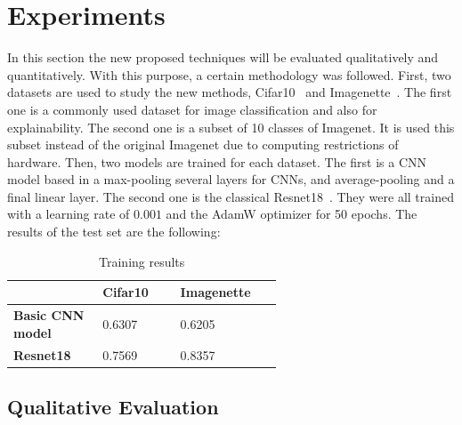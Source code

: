 \documentclass[preprint,12pt]{elsarticle}
\begin{document}
\section{Experiments}
\label{sec:experiments}
In this section the new proposed techniques will be evaluated qualitatively and quantitatively. With this purpose, a certain methodology was followed. First, two datasets are used to study the new methods, Cifar10~\cite{CIFAR10CIFAR100Datasets} and Imagenette~\cite{Imagenette2022}. The first one is a commonly used dataset for image classification and also for explainability. The second one is a subset of 10 classes of Imagenet. It is used this subset instead of the original Imagenet due to computing restrictions of hardware. Then, two models are trained for each dataset. The first is a CNN model based in a max-pooling several layers for CNNs, and average-pooling and a final linear layer. The second one is the classical Resnet18~\cite{heDeepResidualLearning2016}. They were all trained with a learning rate of $0.001$ and the AdamW optimizer for 50 epochs. The results of the test set are the following:

\begin{table}[h!]
    \begin{center}
        \begin{tabular}{|L{0.2\linewidth}|C{0.2\linewidth}|C{0.2\linewidth}|}
            \hline
            \textbf{} & \textbf{Cifar10} & \textbf{Imagenette}\\ \hline
            \textbf{Basic CNN model} & 0.6307 & 0.6205 \\ \hline
            \textbf{Resnet18} & 0.7569 & 0.8357 \\ \hline
        \end{tabular}
        \caption{Training results}
        \label{tab: training results}
    \end{center}
\end{table}

\subsection{Qualitative Evaluation}
\end{document}
